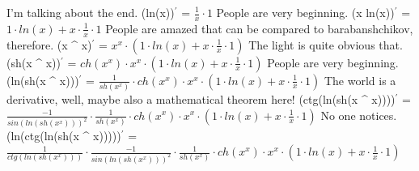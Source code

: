 \documentclass{article}
\begin{document}
{\large I'm talking about the end. 
\newline\newline
(ln(x))$^{'}$ = $\frac{1}{x} \cdot 1$} \newline\newline
{\large People are very beginning. 
\newline\newline
(x \cdot ln(x))$^{'}$ = $1 \cdot ln(x) + x \cdot \frac{1}{x} \cdot 1$} \newline\newline
{\large People are amazed that can be compared to barabanshchikov, therefore. 
\newline\newline
(x ^ {x})$^{'}$ = $x ^ {x} \cdot (1 \cdot ln(x) + x \cdot \frac{1}{x} \cdot 1)$} \newline\newline
{\large The light is quite obvious that. 
\newline\newline
(sh(x ^ {x}))$^{'}$ = $ch(x ^ {x}) \cdot x ^ {x} \cdot (1 \cdot ln(x) + x \cdot \frac{1}{x} \cdot 1)$} \newline\newline
{\large People are very beginning. 
\newline\newline
(ln(sh(x ^ {x})))$^{'}$ = $\frac{1}{sh(x ^ {x})} \cdot ch(x ^ {x}) \cdot x ^ {x} \cdot (1 \cdot ln(x) + x \cdot \frac{1}{x} \cdot 1)$} \newline\newline
{\large The world is a derivative, well, maybe also a mathematical theorem here! 
\newline\newline
(ctg(ln(sh(x ^ {x}))))$^{'}$ = $\frac{-1}{sin(ln(sh(x ^ {x}))) ^ {2}} \cdot \frac{1}{sh(x ^ {x})} \cdot ch(x ^ {x}) \cdot x ^ {x} \cdot (1 \cdot ln(x) + x \cdot \frac{1}{x} \cdot 1)$} \newline\newline
{\large No one notices. 
\newline\newline
(ln(ctg(ln(sh(x ^ {x})))))$^{'}$ = $\frac{1}{ctg(ln(sh(x ^ {x})))} \cdot \frac{-1}{sin(ln(sh(x ^ {x}))) ^ {2}} \cdot \frac{1}{sh(x ^ {x})} \cdot ch(x ^ {x}) \cdot x ^ {x} \cdot (1 \cdot ln(x) + x \cdot \frac{1}{x} \cdot 1)$} \newline\newline
\end{document}
